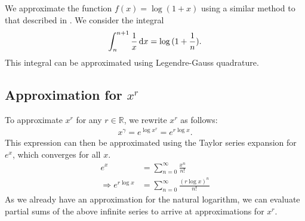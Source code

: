 We approximate the function $f(x)=\log(1+x)$ using a similar method to that described in
\cite{khattri_new_2009}.
We consider the integral
\begin{align*}
  \int_{n}^{n+1}{\frac{1}{x}\mathop{}\!\mathrm{d} x}=\log{(1+\frac{1}{n})}.
\end{align*}
This integral can be approximated using Legendre-Gauss quadrature.

\subsection{Approximation for $x^r$}
To approximate $x^r$ for any $r \in \mathbb{R}$, we rewrite $x^r$ as follows:
\begin{align*}
  x^\gamma = e^{\log{x^r}} = e^{r\log{x}}.
\end{align*}
This expression can then be approximated using the Taylor series expansion for $e^x$, which converges for all $x$.
\begin{align*}
  e^x &= \sum_{n=0}^{\infty}{\frac{x^n}{n!}}\\
  \Rightarrow e^{r\log{x}} &= \sum_{n=0}^{\infty}{\frac{(r\log{x})^n}{n!}}
\end{align*}
As we already have an approximation for the natural logarithm, we can evaluate partial sums of the above infinite series to arrive at approximations for $x^r$.
